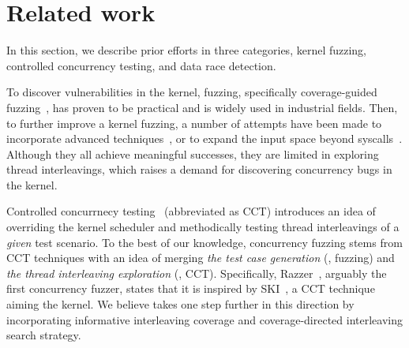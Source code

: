 \section{Related work}
\label{s:relwk}

%
In this section, we describe prior efforts in three categories, kernel
fuzzing, controlled concurrency testing, and data race detection.


%
To discover vulnerabilities in the kernel, fuzzing, specifically
coverage-guided fuzzing~\cite{syzkaller, moonshine, healer, hfl, imf,
  janus, hydra, trinity, kafl, periscope, syzvegas, ksg}, has proven
to be practical and is widely used in industrial fields.
%
%
Then, to further improve a kernel fuzzing, a number of attempts have
been made to incorporate advanced techniques~\cite{moonshine, healer, hfl},
%
or to expand the input space beyond syscalls~\cite{janus, hydra,
  periscope}.
%
Although they all achieve meaningful successes, they are limited in
exploring thread interleavings, which raises a demand for discovering
concurrency bugs in the kernel.







%
Controlled concurrnecy testing~\cite{ski, pctalgorithm, sparsernr,
  chess, nagarakatte2012multicore, abdelrasoul2017promoting,
  cai2016radius, mukherjee2020learning, schedulebounding} (abbreviated
as CCT) introduces an idea of overriding the kernel scheduler and
methodically testing thread interleavings of a \textit{given} test
scenario.
%
%
To the best of our knowledge, concurrency fuzzing stems from CCT
techniques with an idea of merging \textit{the test case generation}
(\ie, fuzzing) and \textit{the thread interleaving exploration} (\ie,
CCT).
%
Specifically, Razzer~\cite{razzer}, arguably the first concurrency
fuzzer, states that it is inspired by SKI~\cite{ski}, a CCT technique
aiming the kernel.
%
We believe \sys takes one step further in this direction by
incorporating informative interleaving coverage and coverage-directed
interleaving search strategy.
%
%



